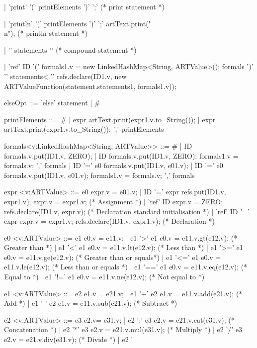 \begin{codeblock}
  | 'print' '(' printElements ')' ';'         (* print statement *)
  
  | 'println' '(' printElements ')' ';' { artText.print("\\n"); } (* println statement *)
  
  | '{' statements '}'              (* compound statement *)

  | 'ref' ID '(' { formals1.v = new LinkedHashMap<String, ARTValue>(); } formals ')'
    '{' statements< '}'
    { refs.declare(ID1.v, new ARTValueFunction(statement.statements1, formals1.v)); }   

elseOpt ::= 'else' statement | #     

printElements ::= 
  # 
  | expr { artText.print(expr1.v.to_String()); } 
  | expr { artText.print(expr1.v.to_String()); } ',' printElements  

formals<v:LinkedHashMap<String, ARTValue>> ::= 
  # 
  | ID { formals.v.put(ID1.v, ZERO); }          
  | ID { formals.v.put(ID1.v, ZERO); formals1.v = formals.v; } ',' formals
  | ID '=' e0 { formals.v.put(ID1.v, e01.v); } 
  | ID '=' e0 { formals.v.put(ID1.v, e01.v); formals1.v = formals.v; } ',' formals

expr <v:ARTValue> ::= 
  e0 { expr.v = e01.v; } 
  | ID '=' expr { refs.put(ID1.v, expr1.v); expr.v = expr1.v; }           (* Assignment *)
  | 'ref' ID { expr.v = ZERO; refs.declare(ID1.v, expr.v); }    (* Declaration standard initialisation *)
  | 'ref' ID '=' expr { expr.v = expr1.v; refs.declare(ID1.v, expr1.v); } (* Declaration *)


e0 <v:ARTValue> ::= 
  e1 { e0.v = e11.v; }  
  | e1 '>'  e1 { e0.v = e11.v.gt(e12.v); }      (* Greater than *)
  | e1 '<'  e1 { e0.v = e11.v.lt(e12.v); }      (* Less than *)
  | e1 '>=' e1 { e0.v = e11.v.ge(e12.v); }      (* Greater than or equals*)
  | e1 '<=' e1 { e0.v = e11.v.le(e12.v); }      (* Less than or equals *)
  | e1 '==' e1 { e0.v = e11.v.eq(e12.v); }      (* Equal to *)
  | e1 '!=' e1 { e0.v = e11.v.ne(e12.v); }      (* Not equal to *)

e1 <v:ARTValue> ::= 
  e2 { e1.v = e21.v; }  
  | e1 '+' e2 { e1.v = e11.v.add(e21.v); }      (* Add *)
  | e1 '-' e2 { e1.v = e11.v.sub(e21.v); }      (* Subtract *)

e2 <v:ARTValue> ::= 
  e3 { e2.v= e31.v; }   
  | e2 ':' e3 { e2.v = e21.v.cat(e31.v); }      (* Concatenation *)
  | e2 '*' e3 { e2.v = e21.v.mul(e31.v); }      (* Multiply *)
  | e2 '/' e3 { e2.v = e21.v.div(e31.v); }      (* Divide *)
  | e2 '%


\end{codeblock}
